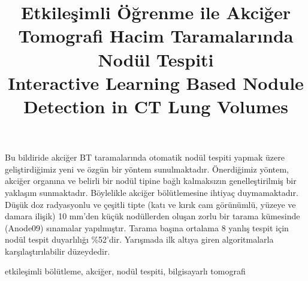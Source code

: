 \documentclass[conference]{IEEEtran}
\begin{document}

%
\title{Etkileşimli Öğrenme ile Akciğer Tomografi Hacim Taramalarında Nodül Tespiti\\
Interactive Learning Based Nodule Detection in CT Lung Volumes}

\author{
}


%




\maketitle

\begin{ozet}
Bu bildiride akciğer BT taramalarında otomatik nodül tespiti yapmak üzere geliştirdiğimiz yeni ve özgün bir yöntem sunulmaktadır. Önerdiğimiz yöntem, akciğer organına ve belirli bir nodül tipine bağlı kalmaksızın genelleştirilmiş bir yaklaşım sunmaktadır. Böylelikle akciğer bölütlemesine ihtiyaç duymamaktadır. Düşük doz radyasyonlu ve çeşitli tipte (katı ve kırık cam görünümlü, yüzeye ve damara ilişik) 10 mm'den küçük nodüllerden oluşan zorlu bir tarama kümesinde (Anode09) sınamalar yapılmıştır. Tarama başına ortalama 8 yanlış tespit için nodül tespit duyarlılığı \%52'dir. Yarışmada ilk altıya giren algoritmalarla karşılaştırılabilir düzeydedir.

\end{ozet}
\begin{IEEEanahtar}
etkileşimli bölütleme, akciğer, nodül tespiti, bilgisayarlı tomografi
\end{IEEEanahtar}
\end{document}
